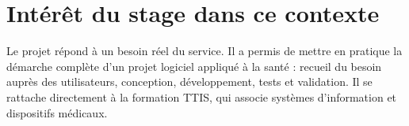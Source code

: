\section{Intérêt du stage dans ce contexte}

Le projet répond à un besoin réel du service. Il a permis de mettre en pratique la démarche complète d'un projet logiciel appliqué à la santé : recueil du besoin auprès des utilisateurs, conception, développement, tests et validation. Il se rattache directement à la formation TTIS, qui associe systèmes d'information et dispositifs médicaux.

